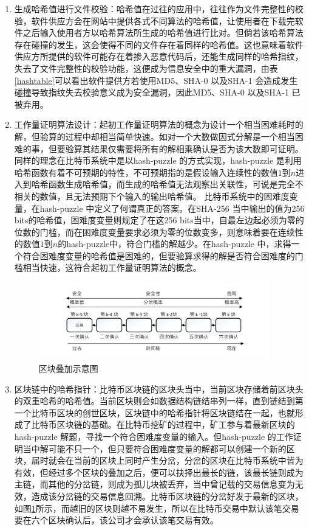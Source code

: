 				\begin{enumerate}
				\item 生成哈希值进行文件校验：哈希值在过往的应用中，往往作为文件完整性的校验，软件供应方会在网站中提供各式不同算法的哈希值，让使⽤者在下载完软件之后输⼊使⽤者方以哈希算法所⽣成的哈希值进⾏⽐对。但倘若该哈希算法存在碰撞的发生，这会使得不同的文件存在着同样的哈希值。这也意味着软件供应方所提供的软件可能存在着掺入恶意代码后，还能生成同样的哈希指纹，失去了文件完整性的校验功能，这便成为信息安全中的重大漏洞，由表\ref{hashtable}可以看出软件提供方若使用MD5、SHA-0 以及SHA-1 会造成发生碰撞导致指纹失去校验意义成为安全漏洞，因此MD5、SHA-0 以及SHA-1 已被弃用。

				\item 工作量证明算法设计：起初工作量证明算法的概念为设计一个相当困难耗时的解，但验算的过程中却相当简单快速。如对一个大数做因式分解是一个相当困难的事，但要验算其结果仅需要将所有的解相乘确认是否为该大数即可证明。同样的理念在比特币系统中是以hash-puzzle 的方式实现，hash-puzzle 是利用哈希函数有着不可预期的特性，不可预期指的是假设输入连续性的数值$1$到$n$进入到哈希函数生成哈希值，而生成的哈希值无法观察出关联性，可说是完全不相关的数值，且无法预期下个输入的输出哈希值。
				比特币系统中的困难度变量，在hash-puzzle 中定义了何谓真正的答案。在SHA-256 当中输出的值为256 bits的哈希值，困难度变量则规定了在这256 bits当中，自最左边起必须为零的位数的门槛，而在困难度变量要求必须为零的位数变多，则意味着要在连续性的数值$1$到$n$的hash-puzzle中，符合门槛的解越少。在hash-puzzle 中，求得一个符合困难度变量的哈希值是困难的，但要验算求得的解是否符合困难度的门槛相当快速，这符合起初工作量证明算法的概念。

				\begin{figure}[!htb]
					\centering
					\includegraphics[width = 0.95\textwidth]{6confirm.pdf}
					\caption{区块叠加示意图}\label{6confirm}
				\end{figure}

				\item 区块链中的哈希指针：比特币区块链的区块头当中，当前区块存储着前区块头的双重哈希的哈希值。当前区块则会如数据结构链结串列一样，直到链结到第一个比特币区块的创世区块，区块链中的哈希指针将区块链结在一起，也就形成了比特币区块链的基础。在比特币挖矿的过程中，矿工参与着最新区块的hash-puzzle 解题，寻找一个符合困难度变量的输入。但hash-puzzle  的工作证明当中解可能不只一个，但只要符合困难度变量的解都可以创建一个新的区块，届时就会在当前的区块上同时产生分岔，分岔的区块在比特币系统中皆为有效，但经过多个区块的叠加之后，便可以抉择出最长的链，该最长链则成为主链，而其他的分岔链，则成为孤儿块被丢弃，当中曾记载的交易信息变为无效，造成该分岔链的交易信息回溯。比特币区块链的分岔好发于最新的区块，如图\ref{6confirm}所示，而越旧的区块则越不易发生，所以在比特币交易中默认该笔交易要在六个区块确认后，该公司才会承认该笔交易有效。

				\end{enumerate}

